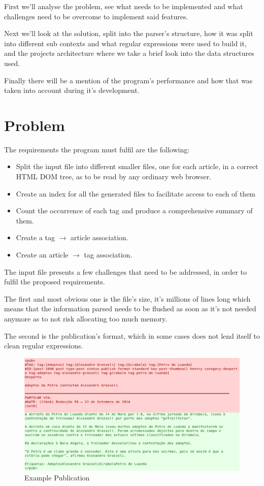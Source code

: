 \documentclass[a4paper]{report}
\begin{document}
First we'll analyse the problem, see what needs to be implemented and what
challenges need to be overcome to implement said features.

Next we'll look at the solution, split into the parser's structure, how it was
split into different sub contexts and what regular expressions were used to
build it, and the projects architecture where we take a brief look into the
data structures used.

Finally there will be a mention of the program's performance and how that was
taken into account during it's development.

\chapter{Problem}

The requirements the program must fulfil are the following:
\begin{itemize}
    \item Split the input file into different smaller files, one for each
        article, in a correct HTML DOM tree, as to be read by any ordinary web
        browser.
    \item Create an index for all the generated files to facilitate access to
        each of them
    \item Count the occurrence of each tag and produce a comprehensive summary
        of them.
    \item Create a tag $\to$ article association.
    \item Create an article $\to$ tag association.
\end{itemize}

The input file presents a few challenges that need to be addressed, in order to fulfil the proposed requirements.

The first and most obvious one is the file's size, it's millions of lines long
which means that the information parsed needs to be flushed as soon as it's not
needed anymore as to not risk allocating too much memory.

The second is the publication's format, which in some cases does not lend
itself to clean regular expressions.

\begin{figure}[H]
    \includegraphics[width=\textwidth]{./example_pub_colored_simple.png}
    \caption{Example Publication}\label{fig:example_pub_simple}
\end{figure}
\end{document}
